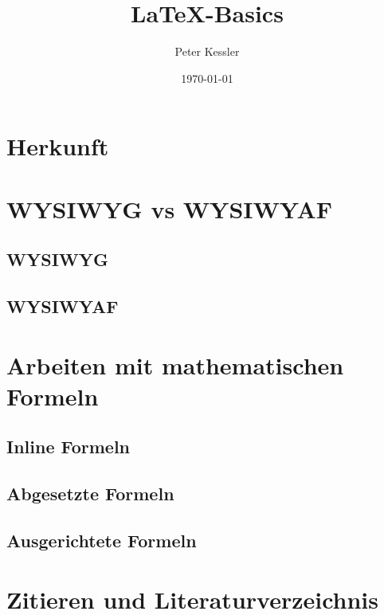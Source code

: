 \documentclass[ 12pt, a4paper, parskip=full]{scrartcl}
\title{\LaTeX-Basics}         %
\author{Peter Kessler}        %
\date{\today}                 %
\begin{document}
\maketitle
\thispagestyle{empty}   %

\pagebreak
\tableofcontents

\pagebreak 
\section{Herkunft}




\pagebreak
\section{WYSIWYG vs WYSIWYAF}

\subsection{WYSIWYG}


\subsection{WYSIWYAF}


\pagebreak
\section{Arbeiten mit mathematischen Formeln}


\subsection{Inline Formeln}


\subsection{Abgesetzte Formeln}


\subsection{Ausgerichtete Formeln}


\pagebreak
\section{Zitieren und Literaturverzeichnis}


\pagebreak


\printbibliography[title={Literatur- \& Quellenverzeichnis}]        
\end{document}
